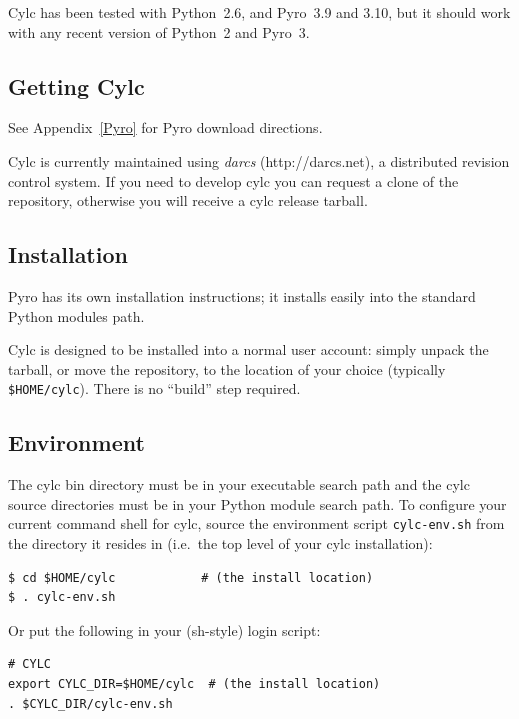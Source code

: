 \documentclass[11pt,a4paper]{article}
\begin{document}
Cylc has been tested with Python~2.6, and Pyro~3.9 and 3.10,
but it should work with any recent version of Python~2 and Pyro~3.

\subsection{Getting Cylc} 
\label{GettingCylc}

See Appendix~\ref{Pyro} for Pyro download directions.

Cylc is currently maintained using {\em darcs} (http://darcs.net), a
distributed revision control system. If you need to develop cylc you can
request a clone of the repository, otherwise you will receive a cylc
release tarball. 

\subsection{Installation} 
\label{Installation}

Pyro has its own installation instructions; it installs easily into the
standard Python modules path.

Cylc is designed to be installed into a normal user account: simply
unpack the tarball, or move the repository, to the location of your
choice (typically \lstinline=$HOME/cylc=). There is no ``build'' step
required.

\subsection{Environment} 
\label{Environment}

\lstset{language=bash} 

The cylc bin directory must be in your executable search path and the
cylc source directories must be in your Python module search path. To
configure your current command shell for cylc, source the environment
script \lstinline=cylc-env.sh= from the directory it resides in (i.e.\
the top level of your cylc installation):

\begin{lstlisting}
$ cd $HOME/cylc            # (the install location)
$ . cylc-env.sh
\end{lstlisting}

Or put the following in your (sh-style) login script:

\begin{lstlisting}
# CYLC
export CYLC_DIR=$HOME/cylc  # (the install location)
. $CYLC_DIR/cylc-env.sh
\end{lstlisting}
\end{document}
